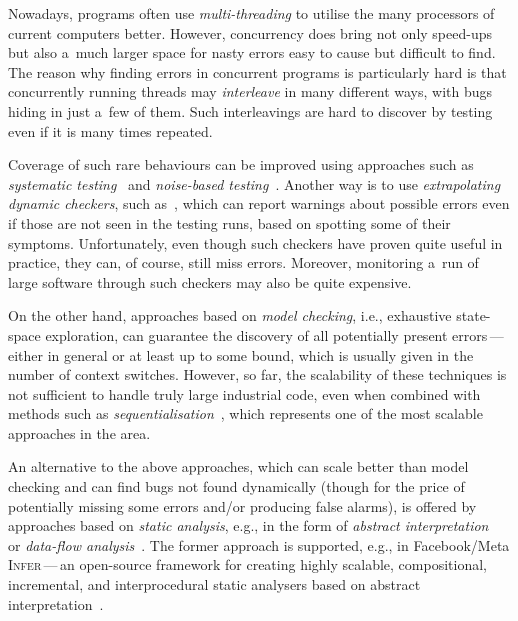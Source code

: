\documentclass[runningheads]{llncs}
\begin{document}
Nowadays, programs often use \emph{multi-threading} to utilise the many
processors of current computers better. However, concurrency does bring not
only speed-ups but also a~much larger space for nasty errors easy to cause
but difficult to find. The reason why finding errors in concurrent programs
is particularly hard is that concurrently running threads may
\emph{interleave} in many different ways, with bugs hiding in just a~few of
them. Such interleavings are hard to discover by testing even if
it is many times repeated.

Coverage of such rare behaviours can be improved using approaches such
as \emph{systematic testing}~\cite{schedspec12} and \emph{noise-based
testing}~\cite{contestframework03,noise15,anaconda}.
Another way is to use \emph{extrapolating dynamic checkers}, such
as~\cite{fasttrack09,velodrome08}, which can report warnings about possible
errors even if those are not seen in the testing runs, based on spotting
some of their symptoms. Unfortunately, even though such checkers have
proven quite useful in practice, they can, of course, still miss errors.
Moreover, monitoring a~run of large software through such checkers may also
be quite expensive.

On the other hand, approaches based on \emph{model checking}, i.e., exhaustive
state-space exploration, can guarantee the discovery of all potentially
present errors\,---\,either in general or at least up to some bound, which
is usually given in the number of context switches. However, so far, the
scalability of these techniques is not sufficient to handle truly large
industrial code, even when combined with methods such as
\emph{sequentialisation}~\cite{lal-reps-08,lazy-seq-16}, which represents
one of the most scalable approaches in the area.

\enlargethispage{4mm}

An alternative to the above approaches, which can scale better than model
checking and can find bugs not found dynamically (though for the price of
potentially missing some errors and/or producing false alarms), is offered by
approaches based on \emph{static analysis}, e.g., in the form of \emph{abstract
interpretation}~\cite{ai77} or \emph{data-flow analysis}~\cite{dfa73}. The
former approach is supported, e.g., in Facebook/Meta \textsc{Infer}\,---\,an
open-source framework for creating highly scalable, compositional,
incremental, and interprocedural static analysers based on abstract
interpretation~\cite{inferNFM15}.
\end{document}
